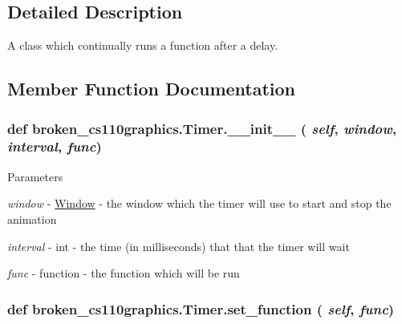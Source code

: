 \subsection{Detailed Description}
A class which continually runs a function after a delay. 

\subsection{Member Function Documentation}
\hypertarget{classbroken__cs110graphics_1_1Timer_aea9f1934a4aca0892291967e330fc4c0}{
\subsubsection[{\_\-\_\-init\_\-\_\-}]{\setlength{\rightskip}{0pt plus 5cm}def broken\_\-cs110graphics.Timer.\_\-\_\-init\_\-\_\- ( {\em self}, \/   {\em window}, \/   {\em interval}, \/   {\em func})}}
\label{classbroken__cs110graphics_1_1Timer_aea9f1934a4aca0892291967e330fc4c0}

\begin{DoxyParams}{Parameters}
\item[{\em window}]-\/ \hyperlink{classbroken__cs110graphics_1_1Window}{Window} -\/ the window which the timer will use to start and stop the animation \item[{\em interval}]-\/ int -\/ the time (in milliseconds) that that the timer will wait \item[{\em func}]-\/ function -\/ the function which will be run \end{DoxyParams}
\hypertarget{classbroken__cs110graphics_1_1Timer_ab3b47919b430fbaf407f025f13306ce5}{
\subsubsection[{set\_\-function}]{\setlength{\rightskip}{0pt plus 5cm}def broken\_\-cs110graphics.Timer.set\_\-function ( {\em self}, \/   {\em func})}}
\label{classbroken__cs110graphics_1_1Timer_ab3b47919b430fbaf407f025f13306ce5}


